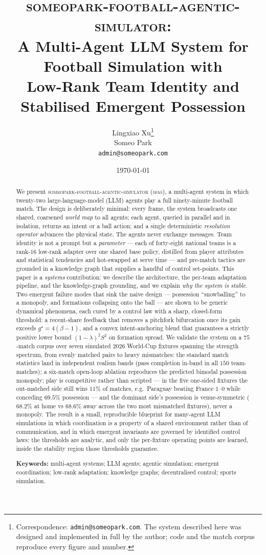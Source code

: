 \documentclass[11pt]{article}
\title{\bfseries \textsc{someopark-football-agentic-simulator}:\\
A Multi-Agent LLM System for Football Simulation with\\
Low-Rank Team Identity and Stabilised Emergent Possession}
\author{Lingxiao Xu\thanks{Correspondence: \texttt{admin@someopark.com}. The system described here was designed and implemented in full by the author; code and the match corpus reproduce every figure and number.}\\
\normalsize Someo Park\\
\normalsize \texttt{admin@someopark.com}}
\date{\today}
\theoremstyle{definition}
\theoremstyle{remark}
\newcommand{\sfas}{\textsc{sfas}}
\begin{document}
\maketitle

\begin{abstract}
\noindent We present \textsc{someopark-football-agentic-simulator} (\sfas), a multi-agent system in which twenty-two large-language-model (LLM) agents play a full ninety-minute football match. The design is deliberately minimal: every frame, the system broadcasts one shared, coarsened \emph{world map} to all agents; each agent, queried in parallel and in isolation, returns an intent or a ball action; and a single deterministic \emph{resolution operator} advances the physical state. The agents never exchange messages. Team identity is not a prompt but a \emph{parameter} --- each of forty-eight national teams is a rank-$16$ low-rank adapter over one shared base policy, distilled from player attributes and statistical tendencies and hot-swapped at serve time --- and pre-match tactics are grounded in a knowledge graph that supplies a handful of control set-points. This paper is a \emph{systems} contribution: we describe the architecture, the per-team adaptation pipeline, and the knowledge-graph grounding, and we explain \emph{why the system is stable}. Two emergent failure modes that sink the naive design --- possession ``snowballing'' to a monopoly, and formations collapsing onto the ball --- are shown to be generic dynamical phenomena, each cured by a control law with a sharp, closed-form threshold: a recent-share feedback that removes a pitchfork bifurcation once its gain exceeds $g^\star=4(\beta-1)$, and a convex intent-anchoring blend that guarantees a strictly positive lower bound $(1-\lambda)^2S^2$ on formation spread. We validate the system on a $75$-match corpus over seven simulated 2026 World-Cup fixtures spanning the strength spectrum, from evenly matched pairs to heavy mismatches: the standard match statistics land in independent realism bands (pass completion in-band in all $150$ team-matches); a six-match open-loop ablation reproduces the predicted bimodal possession monopoly; play is competitive rather than scripted --- in the five one-sided fixtures the out-matched side still wins $11\%$ of matches, e.g.\ Paraguay beating France $1$--$0$ while conceding $69.5\%$ possession --- and the dominant side's possession is venue-symmetric ($68.2\%$ at home vs $68.6\%$ away across the two most mismatched fixtures), never a monopoly. The result is a small, reproducible blueprint for many-agent LLM simulations in which coordination is a property of a shared environment rather than of communication, and in which emergent invariants are governed by identified control laws: the thresholds are analytic, and only the per-fixture operating points are learned, inside the stability region those thresholds guarantee.

\smallskip
\noindent\textbf{Keywords:} multi-agent systems; LLM agents; agentic simulation; emergent coordination; low-rank adaptation; knowledge graphs; decentralised control; sports simulation.
\end{abstract}
\end{document}
